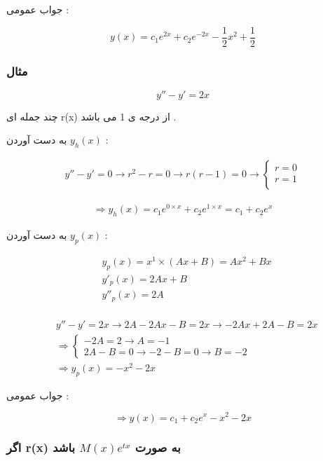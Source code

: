 \documentclass[12pt]{book}
\begin{document}
جواب عمومی :

$$
y(x) = c_{1}e^{2x} + c_{2}e^{-2x} - \frac{1}{2} x^{2} + \frac{1}{2}
$$



\subsubsection{مثال}

$$
y'' - y' = 2x
$$

چند جمله ای r(x) از درجه ی 1 می باشد .


به دست آوردن 
$y_{h}(x)$ :

\begin{align*}
y'' - y' = 0 \to r^{2} - r = 0 \to r( r - 1 ) = 0 \to 
\begin{cases}
r = 0 \\
r = 1 \\
\end{cases}
\end{align*}

\begin{align*}
\Rightarrow y_{h}(x) = c_{1}e^{0 \times x} + c_{2}e^{1 \times x} = c_{1} + c_{2}e^{x}
\end{align*}

به دست آوردن 
$y_{p}(x)$ :

\begin{align*}
&y_{p}(x) = x^{1} \times ( Ax + B ) = Ax^{2} + Bx \\
&y'_{p}(x) = 2Ax + B \\
&y''_{p}(x) = 2A \\
\end{align*}



\begin{align*}
&y'' - y' = 2x \to 2A - 2Ax - B = 2x \to -2Ax + 2A - B = 2x \\
&\Rightarrow \begin{cases}
-2A = 2 \to A = -1 \\
2A - B = 0 \to -2 - B = 0 \to B = -2
\end{cases}
\\
&\Rightarrow y_{p}(x) = -x^{2} - 2x
\end{align*}

جواب عمومی :

$$
\Rightarrow y(x) = c_{1} + c_{2}e^{x} - x^{2} - 2x
$$


\subsubsection{اگر 
r(x)
به صورت
$M(x)e^{tx}$
باشد }
\end{document}
